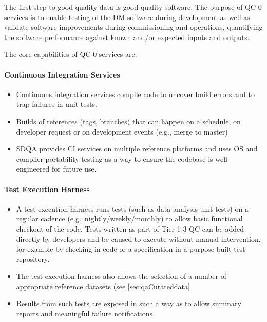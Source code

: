 The first step to good quality data is good quality software. The purpose of QC-0 services is to enable testing of the DM software during development as well as validate software improvements during commissioning and operations, quantifying the software performance against known and/or expected inputs and outputs.

The core capabilities of QC-0 services are:

\paragraph{Continuous Integration Services}
\label{sec:qaCI}
\begin{itemize}

\item Continuous integration services compile code to uncover build errors and to trap failures in unit tests.

\item Builds of references (tags, branches) that can happen on a schedule, on developer request or on development events (e.g.,  merge to master)

\item SDQA provides CI services on multiple reference platforms and uses OS and compiler portability testing as a way to ensure the codebase is well engineered for future use.

\end{itemize}

\paragraph{Test Execution Harness}
\label{sec:qaTestharness}
\begin{itemize}

\item A test execution harness runs tests (such as data analysis unit
  tests) on a regular cadence (e.g.\ nightly/weekly/monthly) to allow
  basic functional checkout of the code. Tests written as part of Tier
  1-3 QC can be added directly by developers and be caused to execute
  without manual intervention, for example by checking in code or a
  specification in a purpose built test repository.

\item The test execution harness also allows the selection of a number of appropriate reference datasets (see \ref{sec:qaCurateddata}

\item Results from such tests are exposed in such a way as to allow summary reports and meaningful failure notifications.

\end{itemize}


